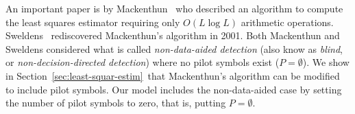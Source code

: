 \documentclass[journal]{IEEEtran}
\begin{document}

An important paper is by Mackenthun~\cite{Mackenthun1994} who described an algorithm to compute the least squares estimator requiring only $O(L \log L)$ arithmetic operations.  Sweldens~\cite{Sweldens2001} rediscovered Mackenthun's algorithm in 2001.  Both Mackenthun and Sweldens considered what is called \emph{non-data-aided detection} (also know as \emph{blind}, or \emph{non-decision-directed detection}) where no pilot symbols exist ($P = \emptyset$).  We show in Section~\ref{sec:least-squar-estim}~that Mackenthun's algorithm can be modified to include pilot symbols. Our model includes the non-data-aided case by setting the number of pilot symbols to zero, that is, putting $P = \emptyset$.
\end{document}

